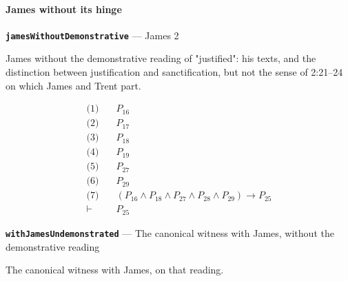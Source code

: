 \documentclass[11pt]{article}
\begin{document}
\paragraph*{James without its hinge}
\leavevmode\par
\par\medskip\noindent\textbf{\texttt{james\allowbreak{}Without\allowbreak{}Demonstrative}} --- James 2\par\nobreak\noindent
James without the demonstrative reading of "justified": his texts, and the distinction between justification and sanctification, but not the sense of 2:21–24 on which James and Trent part.

\begin{align*}
  \text{(1)} \quad & P_{16} \\
  \text{(2)} \quad & P_{17} \\
  \text{(3)} \quad & P_{18} \\
  \text{(4)} \quad & P_{19} \\
  \text{(5)} \quad & P_{27} \\
  \text{(6)} \quad & P_{29} \\
  \text{(7)} \quad & (P_{16} \land P_{18} \land P_{27} \land P_{28} \land P_{29}) \rightarrow P_{25} \\
  \vdash \quad & P_{25}
\end{align*}
\par\medskip\noindent\textbf{\texttt{with\allowbreak{}James\allowbreak{}Undemonstrated}} --- The canonical witness with James, without the demonstrative reading\par\nobreak\noindent
The canonical witness with James, on that reading.
\end{document}
